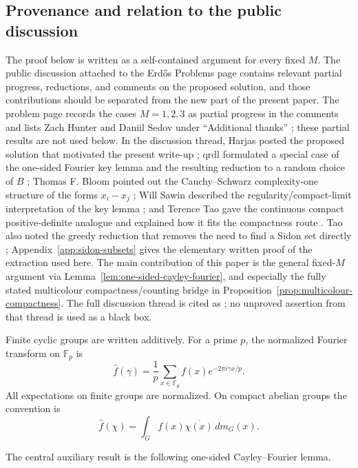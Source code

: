 \documentclass[11pt]{article}
\numberwithin{equation}{section}
\newcommand{\F}{\mathbb F}
\newcommand{\1}{\mathbf 1}
\begin{document}
\subsection*{Provenance and relation to the public discussion}
The proof below is written as a self-contained argument for every fixed
\(M\).  The public discussion attached to the Erd\H{o}s Problems page
contains relevant partial progress, reductions, and comments on the proposed
solution, and those contributions should be separated from the new part of
the present paper.  The problem page records the cases \(M=1,2,3\) as
partial progress in the comments and lists Zach Hunter and Daniil Sedov under
``Additional thanks'' \cite{BloomErdos42}; these partial results are not used
below.  In the discussion thread, Harjas posted the proposed solution that
motivated the present write-up \cite{HarjasProposedSolution}; qrdl formulated
a special case of the one-sided Fourier key lemma and the resulting reduction
to a random choice of \(B\) \cite{qrdlKeyLemma}; Thomas F. Bloom pointed out
the Cauchy--Schwarz complexity-one structure of the forms \(x_i-x_j\)
\cite{BloomComplexity}; Will Sawin described the regularity/compact-limit
interpretation of the key lemma \cite{SawinCompactLimit}; and Terence Tao
gave the continuous compact positive-definite analogue and explained how it
fits the compactness route \cite{TaoContinuousAnalogue}.  Tao also noted the
greedy reduction that removes the need to find a Sidon set directly
\cite{TaoGreedyReduction}; Appendix~\ref{app:sidon-subsets} gives the
elementary written proof of the extraction used here.  The main contribution
of this paper is the general fixed-\(M\) argument via
Lemma~\ref{lem:one-sided-cayley-fourier}, and especially the fully stated
multicolour compactness/counting bridge in
Proposition~\ref{prop:multicolour-compactness}.  The full discussion thread
is cited as \cite{Erdos42Discussion}; no unproved assertion from that thread
is used as a black box.


Finite cyclic groups are written additively.  For a prime \(p\), the
normalized Fourier transform on \(\F_p\) is
\[
        \widehat f(\gamma)
        =
        \frac1p\sum_{x\in\F_p}
        f(x)e^{-2\pi i\gamma x/p}.
\]
All expectations on finite groups are normalized.  On compact abelian
groups the convention is
\[
        \widehat f(\chi)=\int_G f(x)\overline{\chi(x)}\,dm_G(x).
\]

The central auxiliary result is the following one-sided Cayley--Fourier
lemma.
\end{document}
